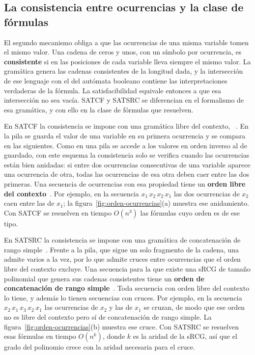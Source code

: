 \documentclass{report}
\theoremstyle{definition}
\theoremstyle{plain}
\theoremstyle{remark}
\begin{document}
\subsection{La consistencia entre ocurrencias y la clase de fórmulas}
\label{subsec:consistencia-clase}

El segundo mecanismo obliga a que las ocurrencias de una misma variable
tomen el mismo valor. Una cadena de ceros y unos, con un símbolo por
ocurrencia, es \textbf{consistente} si en las posiciones de cada variable
lleva siempre el mismo valor. La gramática genera las cadenas
consistentes de la longitud dada, y la intersección de ese lenguaje con
el del autómata booleano contiene las interpretaciones verdaderas de la
fórmula. La satisfacibilidad equivale entonces a que esa intersección no
sea vacía. SATCF y SATSRC se diferencian en el formalismo de esa
gramática, y con ello en la clase de fórmulas que resuelven.

En SATCF la consistencia se impone con una gramática libre del contexto,
~\cite{fernandezarias2007}. En la pila  se guarda
el valor de una variable en su primera ocurrencia y se compara en las
siguientes. Como en una pila se accede a los valores en orden inverso al
de guardado, con este esquema la consistencia solo se verifica cuando
las ocurrencias están bien anidadas: si entre dos ocurrencias
consecutivas de una variable aparece una ocurrencia de otra, todas las
ocurrencias de esa otra deben caer entre las dos primeras. Una secuencia
de ocurrencias con esa propiedad tiene un \textbf{orden libre del
  contexto}~\cite{fernandezarias2007}. Por ejemplo, en la secuencia
$x_1\,x_2\,x_2\,x_1$ las dos ocurrencias de $x_2$ caen entre las de
$x_1$; la figura~\ref{fig:orden-ocurrencias}(a) muestra ese anidamiento.
Con SATCF se resuelven en tiempo $O(n^3)$ las fórmulas cuyo orden es de
ese tipo.

En SATSRC la consistencia se impone con una gramática de concatenación
de rango simple~\cite{aguileralopez2016}. Frente a la pila, que sigue un
solo fragmento de la cadena, una  admite varios a la vez, por lo que
admite cruces entre ocurrencias que el orden libre del contexto excluye.
Una secuencia para la que existe una sRCG de tamaño polinomial que
genera sus cadenas consistentes tiene un \textbf{orden de concatenación
  de rango simple}~\cite{aguileralopez2016}. Toda secuencia con orden
libre del contexto lo tiene, y además lo tienen secuencias con cruces.
Por ejemplo, en la secuencia $x_2\,x_1\,x_3\,x_2\,x_1$ las ocurrencias de
$x_2$ y las de $x_1$ se cruzan, de modo que ese orden no es libre del
contexto pero sí de concatenación de rango simple. La
figura~\ref{fig:orden-ocurrencias}(b) muestra ese cruce.
Con SATSRC se resuelven esas fórmulas en tiempo $O(n^k)$, donde $k$ es la
aridad de la sRCG, así que el grado del polinomio crece con la aridad
necesaria para el cruce.
\end{document}
